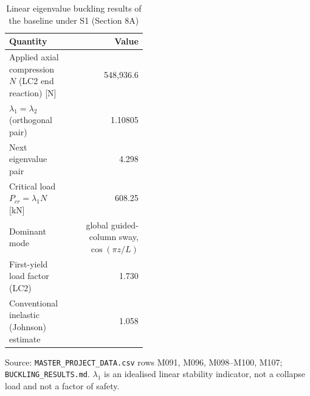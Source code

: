 \begin{table}[htbp]
\centering
\footnotesize
\caption{Linear eigenvalue buckling results of the baseline under S1 (Section 8A)}
\label{tab:buckling}
\begin{tabular}{>{\raggedright\arraybackslash}p{0.45\linewidth}r}
\toprule
Quantity & Value \\
\midrule
Applied axial compression $N$ (LC2 end reaction) [N] & 548,936.6 \\
$\lambda_1 = \lambda_2$ (orthogonal pair) & 1.10805 \\
Next eigenvalue pair & 4.298 \\
Critical load $P_{cr} = \lambda_1 N$ [kN] & 608.25 \\
Dominant mode & global guided-column sway, $\cos(\pi z/L)$ \\
First-yield load factor (LC2) & 1.730 \\
Conventional inelastic (Johnson) estimate & 1.058 \\
\bottomrule
\end{tabular}
\par\smallskip\parbox{\linewidth}{\footnotesize\raggedright Source: \texttt{MASTER\_PROJECT\_DATA.csv} rows M091, M096, M098--M100, M107; \texttt{BUCKLING\_RESULTS.md}. $\lambda_1$ is an idealised linear stability indicator, not a collapse load and not a factor of safety.}
\end{table}
